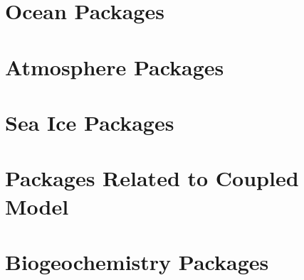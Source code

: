 \section{Ocean Packages}


\newpage


\newpage


\newpage


\newpage


\newpage


\newpage


\newpage


\newpage
\section{Atmosphere Packages}


\newpage


\newpage


\newpage
\section{Sea Ice Packages}


\newpage


\newpage


\newpage


\newpage
\section{Packages Related to Coupled Model}


\newpage


\newpage


\newpage
\section{Biogeochemistry Packages}


\newpage

